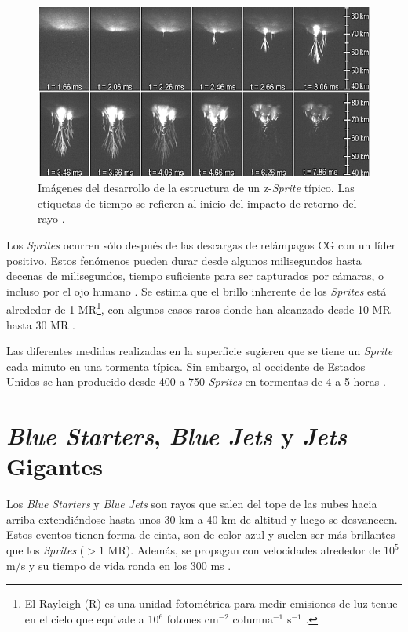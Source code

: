 \documentclass[11pt,oneside,openany,letter]{book}
\begin{document}
\begin{figure}[h!]
    \centering
    \includegraphics[scale=0.8]{figures/sprite_evolution2.png}
    \caption[Evolución temporal de un Sprite]{Imágenes del desarrollo de la estructura de un z-\textit{Sprite} típico. Las etiquetas de tiempo se refieren al inicio del impacto de retorno del rayo \cite{CummerEtal2006}.}
    \label{fig:sprite_evolution}
\end{figure}

Los \textit{Sprites} ocurren sólo después de las descargas de relámpagos CG con un líder positivo. Estos fenómenos pueden durar desde algunos milisegundos hasta decenas de milisegundos, tiempo suficiente para ser capturados por cámaras, o incluso por el ojo humano \cite{Maiorana2014}. Se estima que el brillo inherente de los \textit{Sprites} está alrededor de 1 MR\footnote{El Rayleigh (R) es una unidad fotométrica para medir emisiones de luz tenue en el cielo que equivale a 10$^{6}$ fotones cm$^{-2}$ columna$^{-1}$ s$^{-1}$ \cite{Hunten1956}.}, con algunos casos raros donde han alcanzado desde 10 MR hasta 30 MR \cite{FullekrugEtal2006}. 

Las diferentes medidas realizadas en la superficie sugieren que se tiene un \textit{Sprite} cada minuto en una tormenta típica. Sin embargo, al occidente de Estados Unidos se han producido desde 400 a 750 \textit{Sprites} en tormentas de 4 a 5 horas \cite{FullekrugEtal2006}.

\section{\textit{Blue Starters}, \textit{Blue Jets}  y \textit{Jets} Gigantes}
Los \textit{Blue Starters} y \textit{Blue Jets}  son rayos que salen del tope de las nubes hacia arriba extendiéndose hasta unos 30 km a 40 km de altitud y luego se desvanecen. Estos eventos tienen forma de cinta, son de color azul y suelen ser más brillantes que los \textit{Sprites} ($>1$ MR). Adem\'as, se propagan con velocidades alrededor de $10^5$ m/s y su tiempo de vida ronda en los 300 ms \cite{DwyerUman2014}. 
\end{document}
